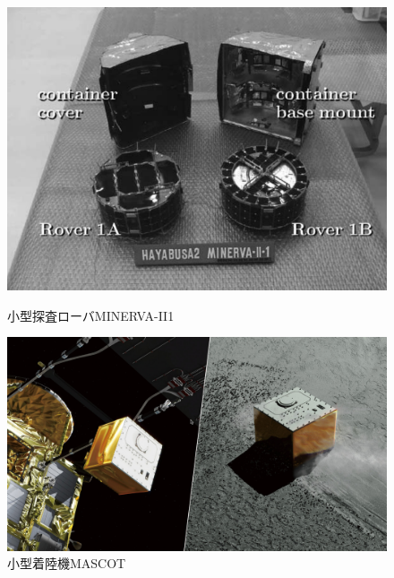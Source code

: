 \documentclass[dvipdfmx,titlepage,a4j]{jsarticle}
\begin{document}
\begin{figure}[H]
    \centering
    \begin{minipage}{0.85\textwidth}
        \centering
        \begin{minipage}[t]{0.45\textwidth}
            \centering
            \includegraphics[width=\textwidth]{picture/mine.png}
            \caption{小型探査ローバMINERVA-II1\cite{minelva:online}}
            \label{fig:minerva}
        \end{minipage}
        \hfill
        \begin{minipage}[t]{0.45\textwidth}
            \centering
            \includegraphics[width=\textwidth]{picture/mascot.jpg}
            \caption{小型着陸機MASCOT\cite{小型着陸機MAS63:online}}
            \label{fig:mascot}
        \end{minipage}
    \end{minipage}
\end{figure}
\end{document}
